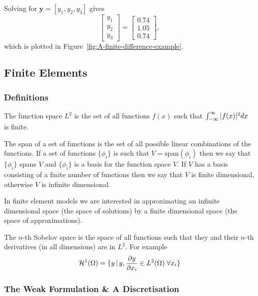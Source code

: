 Solving for $\mathbf{y} = [ y_1, y_2, y_3]$ gives
\begin{equation*}
  \left[
    \begin{array}{c}
      y_{1}\\ y_{2}\\ y_{3}
    \end{array}
  \right]=\left[
    \begin{array}{c}
      0.74\\ 1.05\\ 0.74
    \end{array}
  \right],
\end{equation*}
which is plotted in Figure~\ref{fig:A-finite-difference-example}.


\subsection{Finite Elements}
\label{sec:finite-elements-one-d}

\subsubsection{Definitions}
\label{sec:fem-definitions}

The function space $L^{2}$ is the set of all functions $f(x)$ such
that $\intop_{-\infty}^{\infty}|f(x)|^{2}dx$ is finite.

The span of a set of functions is the set of all possible linear combinations of
the functions. If a set of functions $\{\phi_{i}\}$ is such that
$V=\text{span}(\phi_{i})$ then we say that $\{\phi_{i}\}$ spans $V$ and
$\{\phi_{i}\}$ is a basis for the function space $V$. If $V$ has a basis consisting of a finite number of functions then we say that $V$ is finite dimensional, otherwise $V$ is infinite dimensional.

In finite element models we are interested in approximating an infinite
dimensional space (the space of solutions) by a finite dimensional
space (the space of approximations).

The $n$-th Sobelov space is the space of all functions such that they and their $n$-th derivatives (in all dimensions) are in $L^2$. For example
\begin{equation}
  \label{eq:H1}
  \mathcal{H}^1(\Omega) = \{ y \,|\, y, \frac{\partial y}{\partial x_i} \in L^2(\Omega) \; \forall x_i \}
\end{equation}

\subsubsection{The Weak Formulation \& A Discretisation}
\label{Derivation-of-weighted-residuals}


